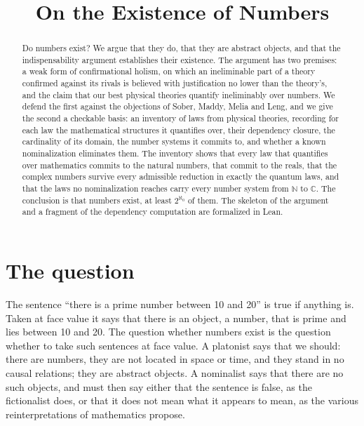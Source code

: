 \documentclass{situationist-preprint}
\title{On the Existence of Numbers}
\begin{document}
\maketitle

\begin{abstract}
Do numbers exist? We argue that they do, that they are abstract objects, and that the indispensability argument establishes their existence. The argument has two premises: a weak form of confirmational holism, on which an ineliminable part of a theory confirmed against its rivals is believed with justification no lower than the theory's, and the claim that our best physical theories quantify ineliminably over numbers. We defend the first against the objections of Sober, Maddy, Melia and Leng, and we give the second a checkable basis: an inventory of \nLaws{} laws from \nTheories{} physical theories, recording for each law the mathematical structures it quantifies over, their dependency closure, the cardinality of its domain, the number systems it commits to, and whether a known nominalization eliminates them. The inventory shows that every law that quantifies over mathematics commits to the natural numbers, that \nNumR{} commit to the reals, that the complex numbers survive every admissible reduction in exactly the quantum laws, and that the laws no nominalization reaches carry every number system from $\mathbb N$ to $\mathbb C$. The conclusion is that numbers exist, at least $2^{\aleph_0}$ of them. The skeleton of the argument and a fragment of the dependency computation are formalized in Lean.
\end{abstract}

\tableofcontents

\section{The question}\label{s:intro}

The sentence \enquote{there is a prime number between 10 and 20} is true if anything is. Taken at face value it says that there is an object, a number, that is prime and lies between 10 and 20. The question whether numbers exist is the question whether to take such sentences at face value. A platonist says that we should: there are numbers, they are not located in space or time, and they stand in no causal relations; they are abstract objects. A nominalist says that there are no such objects, and must then say either that the sentence is false, as the fictionalist does, or that it does not mean what it appears to mean, as the various reinterpretations of mathematics propose.
\end{document}
